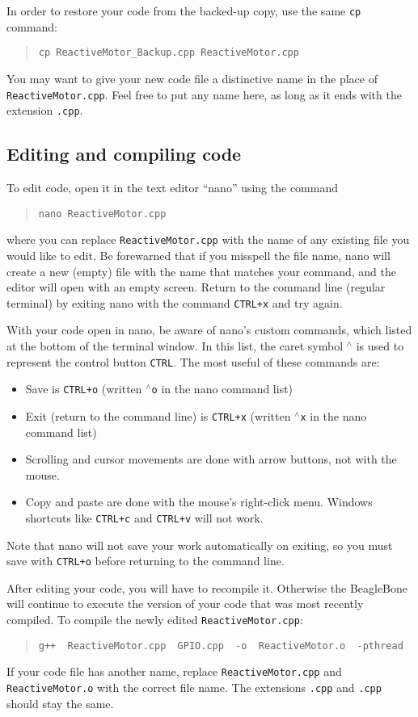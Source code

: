 \documentclass[11pt, letterpaper]{article}
\begin{document}
In order to restore your code from the backed-up copy, use the same \texttt{cp} command:
\begin{quote}
	\texttt{cp ReactiveMotor\_Backup.cpp ReactiveMotor.cpp}
\end{quote}
You may want to give your new code file a distinctive name in the place of \texttt{ReactiveMotor.cpp}. Feel free to put any name here, as long as it ends with the extension \texttt{.cpp}. 

\subsection{Editing and compiling code}
To edit code, open it in the text editor ``nano'' using the command
\begin{quote}
	\texttt{nano ReactiveMotor.cpp}
\end{quote}
where you can replace \texttt{ReactiveMotor.cpp} with the name of any existing file you would like to edit. Be forewarned that if you misspell the file name, nano will create a new (empty) file with the name that matches your command, and the editor will open with an empty screen. Return to the command line (regular terminal) by exiting nano with the command \texttt{CTRL+x} and try again.

With your code open in nano, be aware of nano's custom commands, which listed at the bottom of the terminal window. In this list, the caret symbol \texttt{$^\wedge$} is used to represent the control button \texttt{CTRL}. The most useful of these commands are:
\begin{itemize}
	\item Save is \texttt{CTRL+o} (written \texttt{$^\wedge$o} in the nano command list)
	\item Exit (return to the command line) is \texttt{CTRL+x} (written \texttt{$^\wedge$x} in the nano command list)
	\item Scrolling and cursor movements are done with arrow buttons, not with the mouse.
	\item Copy and paste are done with the mouse's right-click menu. Windows shortcuts like \texttt{CTRL+c} and \texttt{CTRL+v} will not work.
\end{itemize}
Note that nano will not save your work automatically on exiting, so you must save with \texttt{CTRL+o} before returning to the command line.

After editing your code, you will have to recompile it. Otherwise the BeagleBone will continue to execute the version of your code that was most recently compiled. To compile the newly edited \texttt{ReactiveMotor.cpp}:
\begin{quote}
	\texttt{g++~~ReactiveMotor.cpp~~GPIO.cpp~~-o~~ReactiveMotor.o~~-pthread}
\end{quote}
If your code file has another name, replace \texttt{ReactiveMotor.cpp} and \texttt{ReactiveMotor.o} with the correct file name. The extensions \texttt{.cpp} and \texttt{.cpp} should stay the same. 
\end{document}
